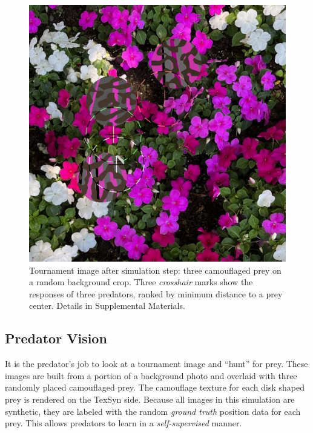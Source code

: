 \documentclass[letterpaper]{article}
\newcommand{\jargon}[1]{\textit{#1}}
\newcommand{\texsyn}[0]{TexSyn}
\begin{document}
\begin{figure}
    \centering
    \includegraphics[width=0.7\columnwidth]{20221007_0806_step_7030.png}
    \caption{Tournament image after simulation step: three camouflaged prey on a random background crop. Three \jargon{crosshair} marks show the responses of three predators, ranked by minimum distance to a prey center. Details in Supplemental Materials.}
    \label{fig:predator_responses}
\end{figure}



\subsection{Predator Vision}
It is the predator's job to look at a tournament image and “hunt” for prey. These images are built from a portion of a background photo and overlaid with three randomly placed camouflaged prey. The camouflage texture for each disk shaped prey is rendered on the \texsyn{} side. Because all images in this simulation are synthetic, they are labeled with the random \jargon{ground truth} position data for each prey. This allows predators to learn in a \jargon{self-supervised} manner.
\par
\end{document}

